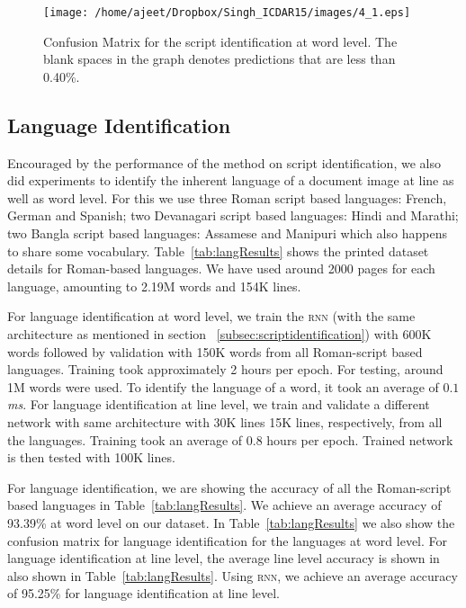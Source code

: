 \begin{center}
\begin{figure}[t]
\centering
\texttt{[image: /home/ajeet/Dropbox/Singh\_ICDAR15/images/4\_1.eps]}
\caption{Confusion Matrix for the script identification at word level. The blank spaces in the graph denotes predictions that are less than 0.40\%.}
\label{fig:confScript}
\end{figure}
\end{center}

\subsection{Language Identification}
\label{subsec:langId}
Encouraged by the performance of the method on script identification, we also did experiments to identify the inherent language of a document image at line as well as word level. For this we use three Roman script based languages: French, German and Spanish; two Devanagari script based languages: Hindi and Marathi; two Bangla script based languages: Assamese and Manipuri which also happens to share some vocabulary. Table~\ref{tab:langResults} shows the printed dataset details for Roman-based languages. We have used around 2000 pages for each language, amounting to 2.19M words and 154K lines.

For language identification at word level, we train the \textsc{rnn} (with the same architecture as mentioned in section ~\ref{subsec:scriptidentification}) with 600K words followed by validation with 150K words from all Roman-script based languages. Training took approximately 2 hours per epoch. For testing, around 1M words were used. To identify the language of a word, it took an average of $\textit{0.1}$ \textit{ms}. For language identification at line level, we train and validate a different network with same architecture with 30K lines 15K lines, respectively, from all the languages. Training took an average of 0.8 hours per epoch. Trained network is then tested with 100K lines.

For language identification, we are showing the accuracy of all the Roman-script based languages in Table~\ref{tab:langResults}. We achieve an average accuracy of 93.39\% at word level on our dataset. In Table~\ref{tab:langResults} we also show the confusion matrix for language identification for the languages at word level. For language identification at line level, the average line level accuracy is shown in also shown in Table~\ref{tab:langResults}. Using \textsc{rnn}, we achieve an average accuracy of 95.25\% for language identification at line level.

